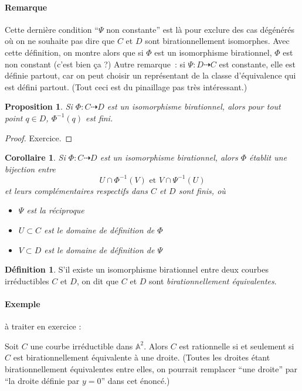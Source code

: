 \documentclass[a4paper, 11pt]{article}
\newtheorem{proposition}[théorème]{Proposition}
\newtheorem{corollaire}[théorème]{Corollaire}
\theoremstyle{definition}
\newtheorem{définition}{Définition}
\newcommand{\aff}{\mathbb{A}}
\begin{document}
\paragraph{Remarque} Cette dernière condition \enquote{$\Psi$ non
  constante} est là pour exclure des cas dégénérés où on ne souhaite
pas dire que $C$ et $D$ sont birationnellement isomorphes. Avec cette
définition, on montre alors que si $\Phi$ est un isomorphisme
birationnel, $\Phi$ est non constant (c'est bien ça ?) Autre
remarque~: si $\Psi : D \dashrightarrow C$ est constante, elle est
définie partout, car on peut choisir un représentant de la classe
d'équivalence qui est défini partout. (Tout ceci est du pinaillage pas
très intéressant.)

\begin{proposition}
  Si $\Phi : C \dashrightarrow D$ est un isomorphisme birationnel,
  alors pour tout point $q \in D$, $\Phi^{-1}(q)$ est fini.
\end{proposition}
\begin{proof}
  Exercice.
\end{proof}
\begin{corollaire}
  Si $\Phi : C \dashrightarrow D$ est un isomorphisme birationnel,
  alors $\Phi$ établit une bijection entre
  \[ U \cap \Phi^{-1}(V) \text{ et } V \cap \Psi^{-1}(U) \]
  et leurs complémentaires respectifs dans $C$ et $D$ sont finis, où
  \begin{itemize}
  \item $\Psi$ est la réciproque
  \item $U \subset C$ est le domaine de définition de $\Phi$
  \item $V \subset D$ est le domaine de définition de $\Psi$
  \end{itemize}
\end{corollaire}

\begin{définition}
  S'il existe un isomorphisme birationnel entre deux courbes
  irréductibles $C$ et $D$, on dit que $C$ et $D$ sont
  \emph{birationnellement équivalentes}.
\end{définition}

\paragraph{Exemple} à traiter en exercice :

Soit $C$ une courbe irréductible dans $\aff^2$. Alors $C$ est
rationnelle si et seulement si $C$ est birationnellement équivalente à
une droite. (Toutes les droites étant birationnellement équivalentes
entre elles, on pourrait remplacer \enquote{une droite} par
\enquote{la droite définie par $y=0$} dans cet énoncé.)
\end{document}

